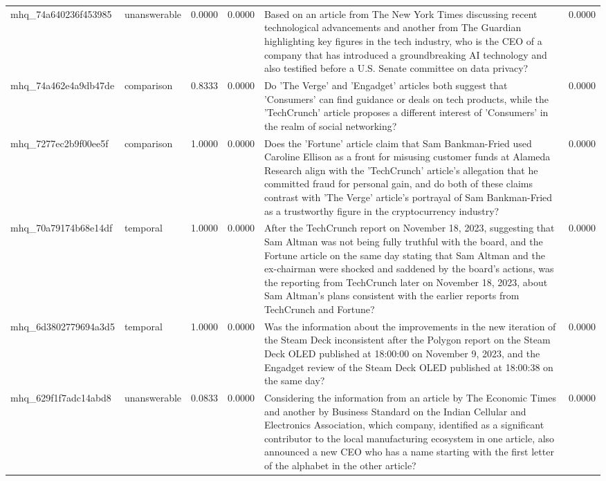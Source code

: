 \begin{tabular}{llrrlr}
mhq_74a640236f453985 & unanswerable & 0.0000 & 0.0000 & Based on an article from The New York Times discussing recent technological advancements and another from The Guardian highlighting key figures in the tech industry, who is the CEO of a company that has introduced a groundbreaking AI technology and also testified before a U.S. Senate committee on data privacy? & 0.0000 \\
mhq_74a462e4a9db47de & comparison & 0.8333 & 0.0000 & Do 'The Verge' and 'Engadget' articles both suggest that 'Consumers' can find guidance or deals on tech products, while the 'TechCrunch' article proposes a different interest of 'Consumers' in the realm of social networking? & 0.0000 \\
mhq_7277ec2b9f00ee5f & comparison & 1.0000 & 0.0000 & Does the 'Fortune' article claim that Sam Bankman-Fried used Caroline Ellison as a front for misusing customer funds at Alameda Research align with the 'TechCrunch' article's allegation that he committed fraud for personal gain, and do both of these claims contrast with 'The Verge' article's portrayal of Sam Bankman-Fried as a trustworthy figure in the cryptocurrency industry? & 0.0000 \\
mhq_70a79174b68e14df & temporal & 1.0000 & 0.0000 & After the TechCrunch report on November 18, 2023, suggesting that Sam Altman was not being fully truthful with the board, and the Fortune article on the same day stating that Sam Altman and the ex-chairman were shocked and saddened by the board's actions, was the reporting from TechCrunch later on November 18, 2023, about Sam Altman's plans consistent with the earlier reports from TechCrunch and Fortune? & 0.0000 \\
mhq_6d3802779694a3d5 & temporal & 1.0000 & 0.0000 & Was the information about the improvements in the new iteration of the Steam Deck inconsistent after the Polygon report on the Steam Deck OLED published at 18:00:00 on November 9, 2023, and the Engadget review of the Steam Deck OLED published at 18:00:38 on the same day? & 0.0000 \\
mhq_629f1f7adc14abd8 & unanswerable & 0.0833 & 0.0000 & Considering the information from an article by The Economic Times and another by Business Standard on the Indian Cellular and Electronics Association, which company, identified as a significant contributor to the local manufacturing ecosystem in one article, also announced a new CEO who has a name starting with the first letter of the alphabet in the other article? & 0.0000 \\

\end{tabular}
